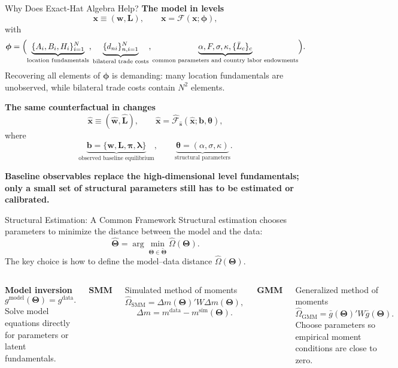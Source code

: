 \documentclass[aspectratio=169,11pt]{beamer}
\newcommand{\B}[1]{\textcolor{blue1}{\textbf{#1}}}
\newcommand{\hi}[1]{\textcolor{deepred}{\textbf{#1}}}
\newcommand{\wh}[1]{\widehat{#1}}
\begin{document}
\begin{frame}[t]{Why Does Exact-Hat Algebra Help?}
  \small
  \B{The model in levels}
  \[
    \mathbf x\equiv(\mathbf w,\mathbf L),
    \qquad
    \mathbf x=\mathcal F(\mathbf x;\boldsymbol\phi),
  \]
  with
  \[
    \boldsymbol\phi
    =\Bigl(
      \underbrace{\{A_i,B_i,H_i\}_{i=1}^{N}}_{\text{location fundamentals}},
      \underbrace{\{d_{ni}\}_{n,i=1}^{N}}_{\text{bilateral trade costs}},
      \underbrace{\alpha,F,\sigma,\kappa,\{\bar L_c\}_c}
        _{\text{common parameters and country labor endowments}}
    \Bigr).
  \]
  Recovering all elements of \(\boldsymbol\phi\) is demanding: many location
  fundamentals are unobserved, while bilateral trade costs contain \(N^2\)
  elements.

  \smallskip
  \B{The same counterfactual in changes}
  \[
    \wh{\mathbf x}\equiv(\wh{\mathbf w},\wh{\mathbf L}),
    \qquad
    \wh{\mathbf x}
      =\widehat{\mathcal F}_{\wh{\mathbf s}}
        (\wh{\mathbf x};\mathbf b,\boldsymbol\theta),
  \]
  where
  \[
    \underbrace{\mathbf b
      =\{\mathbf w,\mathbf L,\boldsymbol\pi,\boldsymbol\lambda\}}
      _{\text{observed baseline equilibrium}},
    \qquad
    \underbrace{\boldsymbol\theta=(\alpha,\sigma,\kappa)}
      _{\text{structural parameters}}.
  \]

  \vfill
  \hi{Baseline observables replace the high-dimensional level fundamentals;
  only a small set of structural parameters still has to be estimated or calibrated.}
\end{frame}

\begin{frame}[t]{Structural Estimation: A Common Framework}
  \footnotesize
  Structural estimation chooses parameters to minimize the distance between
  the model and the data:
  \[
    \widehat{\boldsymbol\Theta}
      =
      \arg\min_{\boldsymbol\Theta\in\widetilde{\boldsymbol\Theta}}
      \widehat\Omega(\boldsymbol\Theta).
  \]
  The key choice is how to define the model--data distance
  \(\widehat\Omega(\boldsymbol\Theta)\).

  \smallskip
  \begin{columns}[T,onlytextwidth]
      \B{Model inversion}
      \[
        g^{\mathrm{model}}(\boldsymbol\Theta)
        =
        g^{\mathrm{data}}.
      \]
      Solve model equations directly for parameters or latent fundamentals.

      \B{SMM}
      \par{\scriptsize Simulated method of moments}
      \[
        \widehat\Omega_{\mathrm{SMM}}
        =
        \Delta m(\boldsymbol\Theta)'W\Delta m(\boldsymbol\Theta),
      \]
      \[
        \Delta m
        =
        m^{\mathrm{data}}-m^{\mathrm{sim}}(\boldsymbol\Theta).
      \]

      \B{GMM}
      \par{\scriptsize Generalized method of moments}
      \[
        \widehat\Omega_{\mathrm{GMM}}
        =
        \bar g(\boldsymbol\Theta)'W\bar g(\boldsymbol\Theta).
      \]
      Choose parameters so empirical moment conditions are close to zero.
  \end{columns}
\end{frame}
\end{document}
